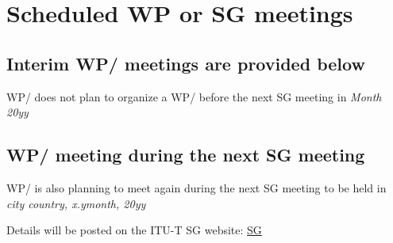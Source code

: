 
\section{Scheduled WP or SG\studyGroup{} meetings}\label{scheduled-wp-or-sg-meetings}

\subsection{Interim WP\workingParty/\studyGroup{} meetings are provided below}\label{interim-wp-meetings}

WP\workingParty/\studyGroup{} does not plan to organize a WP\workingParty/\studyGroup{} before the next SG\studyGroup{} meeting in \textit{Month 20yy}

\subsection{WP\workingParty/\studyGroup{} meeting during the next SG\studyGroup{} meeting}\label{wp-meeting-during-next-sg-meeting}

WP\workingParty/\studyGroup{} is also planning to meet again during the next SG\studyGroup{} meeting to be held in \textit{city country, x.ymonth, 20yy}

Details will be posted on the ITU-T SG\studyGroup{} website: \href{https://www.itu.int/go/tsg17}{SG\studyGroup{}}
